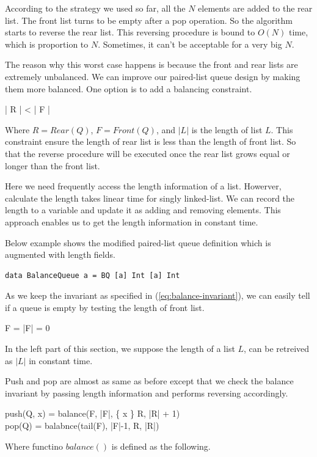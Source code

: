 \documentclass{article}
\begin{document}
According to the strategy we used so far, all the $N$ elements are added
to the rear list. The front list turns to be empty after a pop operation.
So the algorithm starts to reverse the rear list. This reversing procedure
is bound to $O(N)$ time, which is proportion to $N$. Sometimes, it can't be
acceptable for a very big $N$.

The reason why this worst case happens is because the front and rear lists
are extremely unbalanced. We can improve our paired-list queue design
by making them more balanced. One option is to add a balancing constraint.

\be
  | R | < | F |
\label{eq:balance-invariant}
\ee

Where $R = Rear(Q)$, $F = Front(Q)$, and $|L|$ is the length of list $L$. 
This constraint ensure the length
of rear list is less than the length of front list. So that the reverse
procedure will be executed once the rear list grows equal or longer than
the front list.

Here we need frequently access the length information of a list. Howerver,
calculate the length takes linear time for singly linked-list. We can 
record the length to a variable and update it as adding and removing elements.
This approach enables us to get the length information in constant time.

Below example shows the modified paired-list queue definition which is augmented 
with length fields.

\lstset{language=Haskell}
\begin{lstlisting}
data BalanceQueue a = BQ [a] Int [a] Int
\end{lstlisting}

As we keep the invariant as specified in (\ref{eq:balance-invariant}), we
can easily tell if a queue is empty by testing the length of front list.

\be
  F = \Phi \Leftrightarrow |F| = 0
\ee

In the left part of this section, we suppose the length of a list $L$, can
be retreived as $|L|$ in constant time.

Push and pop are almost as same as before except that we check the balance
invariant by passing length information and performs reversing accordingly.

\be
  push(Q, x) = balance(F, |F|, \{ x \} \cup R, |R| + 1) \\
  pop(Q) = balabnce(tail(F), |F|-1, R, |R|)
\ee

Where functino $balance()$ is defined as the following.
\end{document}
